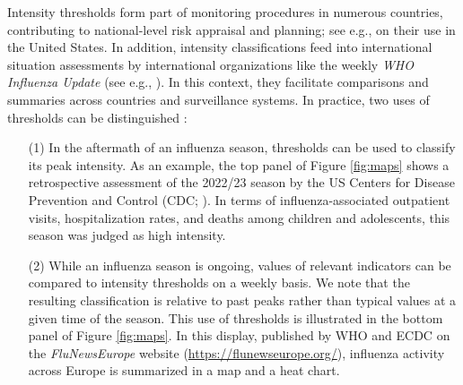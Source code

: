 \documentclass[12pt]{article}
\begin{document}
Intensity thresholds form part of monitoring procedures in numerous countries, contributing to national-level risk appraisal and planning; see e.g., \cite{CDC2024} on their use in the United States. In addition, intensity classifications feed into international situation assessments by international organizations like the weekly \textit{WHO Influenza Update} (see e.g., \citealt{WHO2024}). In this context, they facilitate comparisons and summaries across countries and surveillance systems. In practice, two uses of thresholds can be distinguished \citep{CDC2024}:
\begin{itemize}
\item[(1)] In the aftermath of an influenza season, thresholds can be used to classify its peak intensity. As an example, the top panel of Figure \ref{fig:maps} shows a retrospective assessment of the 2022/23 season by the US Centers for Disease Prevention and Control (CDC; \citealt{White2023}). In terms of influenza-associated outpatient visits, hospitalization rates, and deaths among children and adolescents, this season was judged as high intensity.
\item[(2)] While an influenza season is ongoing, values of relevant indicators can be compared to intensity thresholds on a weekly basis. We note that the resulting classification is relative to past peaks rather than typical values at a given time of the season. This use of thresholds is illustrated in the bottom panel of Figure \ref{fig:maps}. In this display, published by WHO and ECDC on the \textit{FluNewsEurope} website (\url{https://flunewseurope.org/}), influenza activity across Europe is summarized in a map and a heat chart.
\end{itemize}
\end{document}
